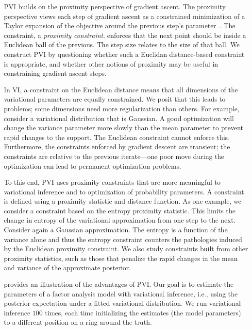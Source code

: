 \gls{PVI} builds on the proximity perspective of gradient ascent.  The proximity perspective views each step of gradient ascent as a constrained minimization of a Taylor expansion of the objective around the previous step's parameter~\citep{Spall:2003,boyd2004convex}.  The constraint, a \textit{proximity constraint}, enforces that the next point should be inside a Euclidean ball of the previous.  The step size relates to the size of that ball. We construct \gls{PVI} by questioning whether such a Euclidan distance-based constraint is appropriate, and whether other notions of proximity may be useful in constraining gradient ascent steps.

In \gls{VI}, a constraint on the Euclidean distance means that all dimensions of the variational parameters are equally constrained. We posit that this leads to problems; some dimensions need more regularization than others. For example, consider a variational distribution that is Gaussian.  A good optimization will change the variance parameter more slowly than the mean parameter to prevent rapid changes to the support.  The Euclidean constraint cannot enforce this. Furthermore, the constraints enforced by gradient descent are transient; the constraints are relative to the previous iterate---one poor move during the optimization can lead to permanent optimization problems.

To this end, \gls{PVI} uses proximity constraints that are more meaningful to variational inference and to optimization of probability parameters.  A constraint is defined using a proximity statistic and distance function. As one example, we consider a constraint based on the entropy proximity statistic. This limits the change in entropy of the variational approximation from one step to the next.  Consider again a Gaussian approximation. The entropy is a function of the variance alone and thus the entropy constraint counters the pathologies induced by the Euclidean proximity constraint. We also study constraints built from other proximity statistics, such as those that penalize the rapid changes in the mean and variance of the approximate posterior.

 provides an illustration of the advantages of \gls{PVI}.  Our goal is to estimate the parameters of a factor analysis model with variational inference, i.e., using the posterior expectation under a fitted variational distribution.  We run variational inference $100$ times, each time initializing the estimates (the model parameters) to a different position on a ring around the truth.

